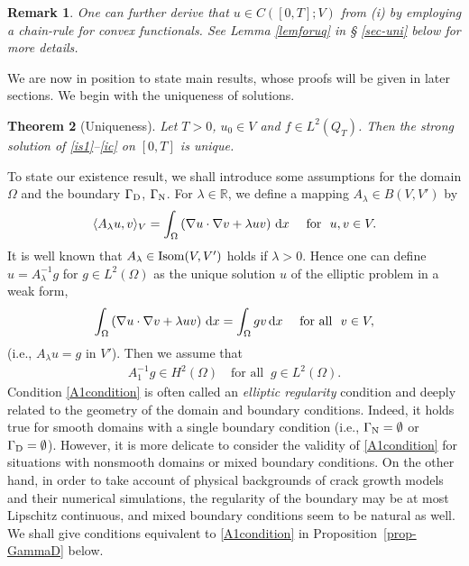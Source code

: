 \documentclass[reqno,10pt]{amsart}
\newtheorem{Th}{Theorem}[section]
\newtheorem{Rem}[Th]{Remark}
\begin{document}
\begin{Rem}\label{R:def}
{\rm
 One can further derive that $u \in C([0,T];V)$ from (i) by employing a
 chain-rule for convex functionals. See Lemma \ref{lemforuq} in \S
 \ref{sec-uni} below for more details.
}
\end{Rem}

We are now in position to state main results, whose proofs
will be given in later sections. We begin with the uniqueness of
solutions. 

\begin{Th}[Uniqueness]\label{th-uni}
Let $T > 0$, $u_0 \in V$ and $f \in L^2(Q_T)$. Then the strong
 solution of \eqref{is1}--\eqref{ic} on $[0,T]$ is unique.
\end{Th}

To state our existence result, we shall introduce some assumptions
for the domain $\Omega$ and the boundary ${{\Gamma_{\rm\scriptsize D}}}$, ${{\Gamma_{\rm\scriptsize N}}}$.
For $\lambda \in {{\mathbb R}}$, we define a mapping $A_\lambda\in B(V,V')$ by
\begin{equation}\label{def:A-lam}
\langle A_\lambda u,v\rangle_V =
\int_\Omega \left(\nabla u\cdot\nabla v + \lambda uv\right)\,{\text{\rm d}} x
\quad \mbox{ for } \ u,v\in V.
\end{equation}
It is well known that $A_\lambda \in {\mbox{\rm Isom}} (V,V')$ holds if $\lambda >0$.
Hence one can define $u = A_\lambda^{-1} g$ for $g \in L^2(\Omega)$ as
the unique solution $u$ of the elliptic problem in a weak form,
$$
\int_\Omega \left(\nabla u\cdot\nabla v + \lambda uv\right)\,{\text{\rm d}} x
= \int_\Omega g v \, {\text{\rm d}} x
\quad \mbox{ for all } \ v \in V,
$$
(i.e., $A_\lambda u = g$ in $V'$). Then we assume that
\begin{align}\label{A1condition}
A_1^{-1}g\in H^2(\Omega)\quad \mbox{for all } \ g\in L^2(\Omega).
\end{align}
Condition \eqref{A1condition} is often called an \emph{elliptic
regularity} condition and deeply related to the geometry of the domain and
boundary conditions. Indeed, it holds true for smooth domains with a
single boundary condition (i.e., ${{\Gamma_{\rm\scriptsize N}}} = \emptyset$ or ${{\Gamma_{\rm\scriptsize D}}} =
\emptyset$). However, it is more delicate to consider the validity of
\eqref{A1condition} for situations with nonsmooth domains or mixed
boundary conditions. On the other hand, in order to take account of
physical backgrounds of crack growth models and their numerical
simulations, the regularity of the boundary may be at most Lipschitz
continuous, and mixed boundary conditions seem to be natural as well.
We shall give conditions equivalent to \eqref{A1condition} in
Proposition~\ref{prop-GammaD} below.
\end{document}
